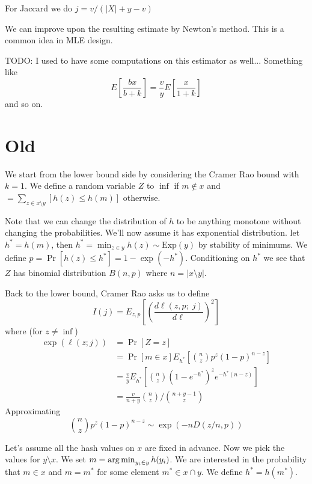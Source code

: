 For Jaccard we do $j = v/(|X| + y - v)$


We can improve upon the resulting estimate by Newton's method.
This is a common idea in MLE design. %

TODO: I used to have some computations on this estimator as well...
Something like
\[
   E[\frac{bx}{b+k}] = \frac{v}{y} E[\frac{x}{1+k}]
\]
and so on.

\section{Old}


We start from the lower bound side by considering the Cramer Rao bound with $k=1$.
We define a random variable $Z$ to $\inf$ if $m\not\in x$ and $
= \sum_{z\in x\setminus y} [h(z) \le h(m)]$ otherwise.

Note that we can change the distribution of $h$ to be anything monotone without changing the probabilities.
We'll now assume it has exponential distribution.
let $h^* = h(m)$, then $h^* = \min_{z\in y}h(z) \sim \text{Exp}(y)$ by stability of minimums.
We define $p=\Pr[h(z)\le h^*] = 1-\exp(-h^*)$.
Conditioning on $h^*$ we see that $Z$ has binomial distribution $B(n,p)$ where $n=|x\setminus y|$.

Back to the lower bound, 
Cramer Rao asks us to define
\[
   I(j) = E_{z,p}\left[\left(\frac{d\ell(z,p;\; j)}{d\ell}\right)^2\right]
\]
where (for $z\not=\inf$)
\begin{align}
   \exp(\ell(z;j))
   &=\Pr[Z=z]
 \\&= \Pr[m\in x]E_{h^*}[\binom{n}{z}p^z(1-p)^{n-z}]
 \\&= \tfrac{v}{y}E_{h^*}[\binom{n}{z} (1-e^{-h^*})^z e^{-h^*(n-z)}]
 \\&= \frac{v}{n+y}\binom{n}{z}\bigg/\binom{n+y-1}{z}
\end{align}
Approximating
\[
   \binom{n}{z}p^z(1-p)^{n-z} \sim \exp(-n D(z/n, p))
\]


Let's assume all the hash values on $x$ are fixed in advance.
Now we pick the values for $y\setminus x$.
We set $m=\operatorname*{arg\,min}_{y_i\in y} h(y_i)$.
We are interested in the probability that $m\in x$ and $m=m^*$ for some element $m^*\in x\cap y$.
We define $h^*=h(m^*)$.


